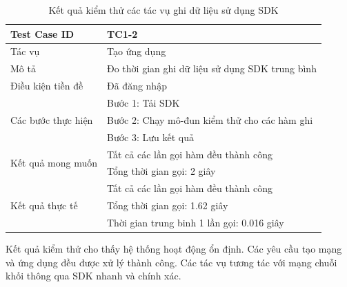 \documentclass[../DoAn.tex]{subfiles}
\begin{document}
\begingroup
\renewcommand{\arraystretch}{1.5} %
\begin{table}[H]
    \centering
    \def\arraystretch{1.5}
    \caption{Kết quả kiểm thử các tác vụ ghi dữ liệu sử dụng SDK}
    \label{tab:TestSDKWrite}
    \begin{tabular}{|p{}|p{}|}
        \hline
        Test Case ID                                       & TC1-2                                           \\ \hline
        Tác vụ                                             & Tạo ứng dụng                                    \\ \hline
        Mô tả                                              & Đo thời gian ghi dữ liệu sử dụng SDK trung bình \\ \hline
        Điều kiện tiền đề                                  & Đã đăng nhập                                    \\ \hline
        \multirow[t]{3}{0.3\textwidth}{Các bước thực hiện} & Bước 1: Tải SDK                                 \\
                                                           & Bước 2: Chạy mô-đun kiểm thử cho các hàm ghi    \\
                                                           & Bước 3: Lưu kết quả                             \\ \hline
        \multirow[t]{2}{0.3\textwidth}{Kết quả mong muốn}  & Tất cả các lần gọi hàm đều thành công           \\
                                                           & Tổng thời gian gọi: 2 giây                      \\ \hline
        \multirow[t]{3}{0.3\textwidth}{Kết quả thực tế}    & Tất cả các lần gọi hàm đều thành công           \\
                                                           & Tổng thời gian gọi: 1.62 giây                   \\
                                                           & Thời gian trung binh 1 lần gọi: 0.016 giây      \\ \hline
    \end{tabular}
\end{table}
\endgroup

Kết quả kiểm thử cho thấy hệ thống hoạt động ổn định. Các yêu cầu tạo mạng và ứng dụng đều được xử lý thành công. Các tác vụ tương tác với mạng chuỗi khối thông qua SDK nhanh và chính xác.
\end{document}
